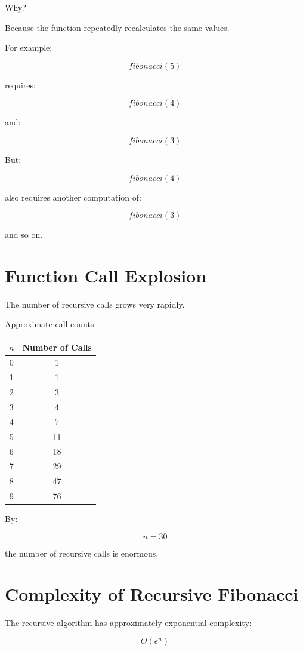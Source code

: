 \documentclass[11pt]{article}
\begin{document}
Why?

Because the function repeatedly recalculates the same values.

For example:

\[
fibonacci(5)
\]

requires:

\[
fibonacci(4)
\]

and:

\[
fibonacci(3)
\]

But:

\[
fibonacci(4)
\]

also requires another computation of:

\[
fibonacci(3)
\]

and so on.

\section{Function Call Explosion}

The number of recursive calls grows very rapidly.

Approximate call counts:

\begin{center}
\begin{tabular}{cc}
\toprule
$n$ & Number of Calls \\
\midrule
0 & 1 \\
1 & 1 \\
2 & 3 \\
3 & 4 \\
4 & 7 \\
5 & 11 \\
6 & 18 \\
7 & 29 \\
8 & 47 \\
9 & 76 \\
\bottomrule
\end{tabular}
\end{center}

By:

\[
n = 30
\]

the number of recursive calls is enormous.

\section{Complexity of Recursive Fibonacci}

The recursive algorithm has approximately exponential complexity:

\[
O(e^n)
\]
\end{document}
